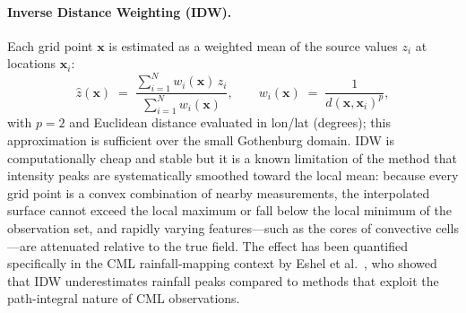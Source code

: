 \documentclass[12pt, a4paper]{article}
\begin{document}
\paragraph{Inverse Distance Weighting (IDW).} Each grid point
\(\mathbf{x}\) is estimated as a weighted mean of the source values
\(z_i\) at locations \(\mathbf{x}_i\):
\begin{equation}
  \hat{z}(\mathbf{x}) \;=\;
  \frac{\sum_{i=1}^{N} w_i(\mathbf{x})\, z_i}
       {\sum_{i=1}^{N} w_i(\mathbf{x})},
  \qquad
  w_i(\mathbf{x}) \;=\; \frac{1}{d(\mathbf{x},\mathbf{x}_i)^{p}},
  \label{eq:idw}
\end{equation}
with \(p=2\) and Euclidean distance evaluated in lon/lat (degrees);
this approximation is sufficient over the small Gothenburg domain. IDW
is computationally cheap and stable but it is a known limitation of
the method that intensity peaks are systematically smoothed toward the
local mean: because every grid point is a convex combination of nearby
measurements, the interpolated surface cannot exceed the local maximum
or fall below the local minimum of the observation set, and rapidly
varying features---such as the cores of convective cells---are
attenuated relative to the true field. The effect has been quantified
specifically in the CML rainfall-mapping context by Eshel et al.\
\cite{eshel2021spatial}, who showed that IDW underestimates rainfall
peaks compared to methods that exploit the path-integral nature of CML
observations.
\end{document}
